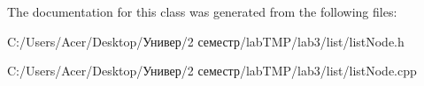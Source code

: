 The documentation for this class was generated from the following files\-:\begin{DoxyCompactItemize}
\item 
C\-:/\-Users/\-Acer/\-Desktop/Универ/2 семестр/lab\-T\-M\-P/lab3/list/list\-Node.\-h\item 
C\-:/\-Users/\-Acer/\-Desktop/Универ/2 семестр/lab\-T\-M\-P/lab3/list/list\-Node.\-cpp\end{DoxyCompactItemize}
